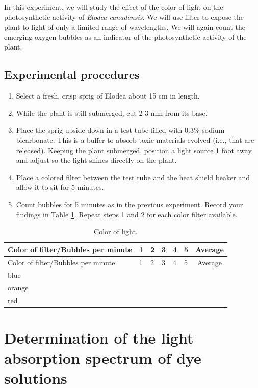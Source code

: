 In this experiment, we will study the effect of the color of light on
the photosynthetic activity of \emph{Elodea canadensis}. We will use
filter to expose the plant to light of only a limited range of
wavelengths. We will again count the emerging oxygen bubbles as an
indicator of the photosynthetic activity of the plant.

\subsection{Experimental procedures}\label{experimental-procedures-22}

\begin{enumerate}
\def\labelenumi{\arabic{enumi}.}
\tightlist
\item
  Select a fresh, crisp sprig of Elodea about 15 cm in length.
\item
  While the plant is still submerged, cut 2-3 mm from its base.
\item
  Place the sprig upside down in a test tube filled with 0.3\% sodium
  bicarbonate. This is a buffer to absorb toxic materials evolved (i.e.,
  that are released). Keeping the plant submerged, position a light
  source 1 foot away and adjust so the light shines directly on the
  plant.
\item
  Place a colored filter between the test tube and the heat shield
  beaker and allow it to sit for 5 minutes.
\item
  Count bubbles for 5 minutes as in the previous experiment. Record your
  findings in Table \ref{tab:color}. Repeat steps 1 and 2 for each color
  filter available.
\end{enumerate}

\begin{longtable}[]{@{}llllllc@{}}
\caption{\label{tab:color} Color of light.}\tabularnewline
\toprule
Color of filter/Bubbles per minute & 1 & 2 & 3 & 4 & 5 &
Average\tabularnewline
\midrule
\endfirsthead
\toprule
Color of filter/Bubbles per minute & 1 & 2 & 3 & 4 & 5 &
Average\tabularnewline
\midrule
\endhead
blue & & & & & &\tabularnewline
orange & & & & & &\tabularnewline
red & & & & & &\tabularnewline
\bottomrule
\end{longtable}

\section{Determination of the light absorption spectrum of dye
solutions}\label{determination-of-the-light-absorption-spectrum-of-dye-solutions}

